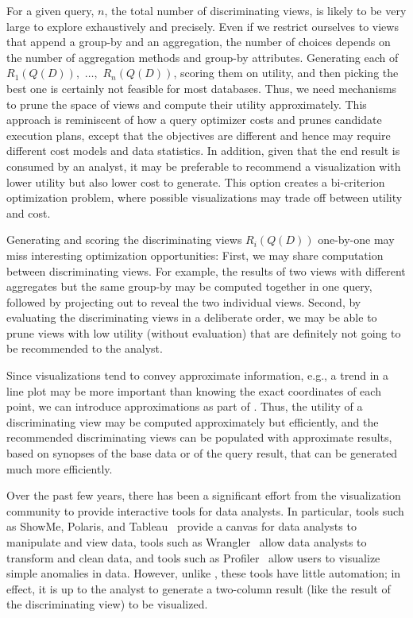 \documentclass{sig-alternate}
\begin{document}
\begin{denselist}

\item For a given query, $n$, the total number of discriminating views, is likely to be very large to explore exhaustively and precisely. Even if we restrict ourselves to views that append a group-by and an aggregation, the number of choices depends on the number of aggregation methods and group-by attributes. Generating each of $R_1(Q(D)),$  $\ldots,$ $R_n(Q(D))$, scoring them on utility, and then picking the best one is certainly not feasible for most databases. Thus, we need mechanisms to prune the space of views and compute their utility approximately. This approach is reminiscent of how a query optimizer costs and prunes candidate execution plans, except that the objectives are different and hence may require different cost models and data statistics. In addition, given that the end result is consumed by an analyst, it may be preferable to recommend a visualization with lower utility but also lower cost to generate. This option creates a bi-criterion optimization problem, where possible visualizations may trade off between utility and cost.

\item Generating and scoring the discriminating views $R_i(Q(D))$ one-by-one may miss interesting optimization opportunities: First, we may share computation between discriminating views.  For example,
the results of two views with different aggregates but the same group-by may be computed together in one query, followed by projecting out to reveal the two individual views.  Second, by evaluating the discriminating views in a deliberate order, we may be able to prune views with
low utility (without evaluation) that are definitely not going to be recommended to the analyst.

\item Since visualizations tend to convey approximate information, e.g., a trend in a line plot may be more important than knowing the exact coordinates of each point, we can introduce approximations as part of \SeeDB.  Thus, the utility of a discriminating view may be computed approximately but efficiently, and the recommended discriminating views can be populated with approximate results, based on synopses of the base data or of the query result, that can be generated much more efficiently.

\end{denselist}

\noindent Over the past few years, there has been a significant
effort from the visualization community to provide interactive tools
for data analysts. In particular, tools such as ShowMe, Polaris, and
Tableau~\cite{DBLP:journals/cacm/StolteTH08,
  DBLP:journals/tvcg/MackinlayHS07} provide a canvas for data analysts
to manipulate and view data, tools such as
Wrangler~\cite{DBLP:conf/chi/KandelPHH11} allow data analysts to
transform and clean data, and tools such as
Profiler~\cite{DBLP:conf/avi/KandelPPHH12} allow users to visualize
simple anomalies in data.  However, unlike \SeeDB, these tools have
little automation; in effect, it is up to the analyst to generate a
two-column result (like the result of the discriminating view)
to be visualized.
\end{document}
